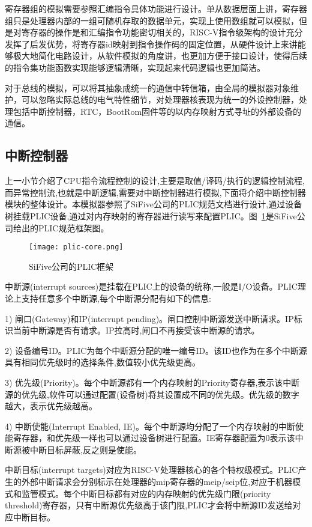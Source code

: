寄存器组的模拟需要参照汇编指令具体功能进行设计。单从数据层面上讲，寄存器组只是处理器内部的一组可随机存取的数据单元，实现上使用数组就可以模拟，但是对寄存器的操作是和汇编指令功能密切相关的，RISC-V指令级架构的设计充分发挥了后发优势，将寄存器id映射到指令操作码的固定位置，从硬件设计上来讲能够极大地简化电路设计，从软件模拟的角度讲，也更加方便于接口设计，使得后续的指令集功能函数实现能够逻辑清晰，实现起来代码逻辑也更加简洁。


对于总线的模拟，可以将其抽象成统一的通信中转信箱，由全局的模拟器对象维护，可以忽略实际总线的电气特性细节，对处理器核表现为统一的外设控制器，处理包括中断控制器，RTC，BootRom固件等的以内存映射方式寻址的外部设备的通信。

\subsection{中断控制器}
上一小节介绍了CPU指令流程控制的设计,主要是取值/译码/执行的逻辑控制流程,而异常控制流,也就是中断逻辑,需要对中断控制器进行模拟,下面将介绍中断控制器模块的整体设计。本模拟器参照了SiFive公司的PLIC规范文档进行设计,通过设备树挂载PLIC设备,通过对内存映射的寄存器进行读写来配置PLIC。图~\ref{fig:plic-core}是SiFive公司给出的PLIC规范框架图。
\begin{figure}[H]
    \centering
    \texttt{[image: plic-core.png]}
    \caption{SiFive公司的PLIC框架}
    \label{fig:plic-core}
\end{figure}


中断源(interrupt sources)是挂载在PLIC上的设备的统称,一般是I/O设备。PLIC理论上支持任意多个中断源,每个中断源分配有如下的信息:


1) 闸口(Gateway)和IP(interrupt pending)。闸口控制中断源发送中断请求。IP标识当前中断源是否有请求。IP拉高时,闸口不再接受该中断源的请求。


2) 设备编号ID。PLIC为每个中断源分配的唯一编号ID。该ID也作为在多个中断源具有相同优先级时的选择条件,数值较小优先级更高。


3) 优先级(Priority)。每个中断源都有一个内存映射的Priority寄存器,表示该中断源的优先级,软件可以通过配置(设备树)将其设置成不同的优先级。优先级的数字越大，表示优先级越高。


4) 中断使能(Interrupt Enabled, IE)。每个中断源均分配了一个内存映射的中断使能寄存器，和优先级一样也可以通过设备树进行配置。IE寄存器配置为0表示该中断源被中断目标屏蔽,反之则是使能。


中断目标(interrupt targets)对应为RISC-V处理器核心的各个特权级模式。PLIC产生的外部中断请求会分别标示在处理器的mip寄存器的meip/seip位,对应于机器模式和监管模式。每个中断目标都有对应的内存映射的优先级门限(priority threshold)寄存器，只有中断源优先级高于该门限,PLIC才会将中断源ID发送给对应中断目标。


